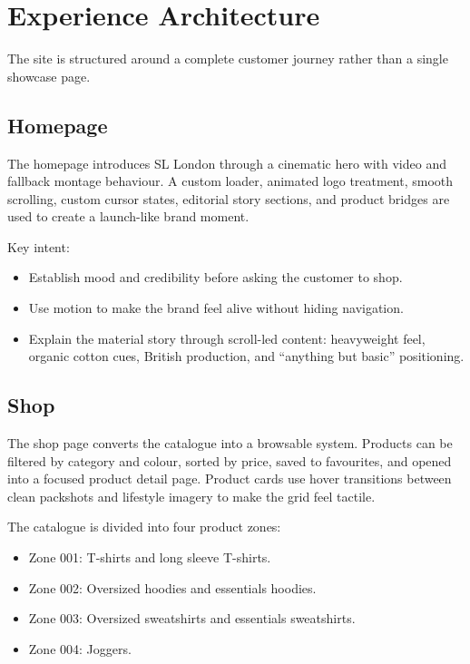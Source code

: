 \documentclass[11pt,a4paper]{article}
\newcommand{\project}{SL London}
\begin{document}
\section{Experience Architecture}

The site is structured around a complete customer journey rather than a single showcase page.

\subsection{Homepage}

The homepage introduces \project{} through a cinematic hero with video and fallback montage behaviour. A custom loader, animated logo treatment, smooth scrolling, custom cursor states, editorial story sections, and product bridges are used to create a launch-like brand moment.

Key intent:

\begin{itemize}
    \item Establish mood and credibility before asking the customer to shop.
    \item Use motion to make the brand feel alive without hiding navigation.
    \item Explain the material story through scroll-led content: heavyweight feel, organic cotton cues, British production, and ``anything but basic'' positioning.
\end{itemize}

\subsection{Shop}

The shop page converts the catalogue into a browsable system. Products can be filtered by category and colour, sorted by price, saved to favourites, and opened into a focused product detail page. Product cards use hover transitions between clean packshots and lifestyle imagery to make the grid feel tactile.

The catalogue is divided into four product zones:

\begin{itemize}
    \item Zone 001: T-shirts and long sleeve T-shirts.
    \item Zone 002: Oversized hoodies and essentials hoodies.
    \item Zone 003: Oversized sweatshirts and essentials sweatshirts.
    \item Zone 004: Joggers.
\end{itemize}
\end{document}
